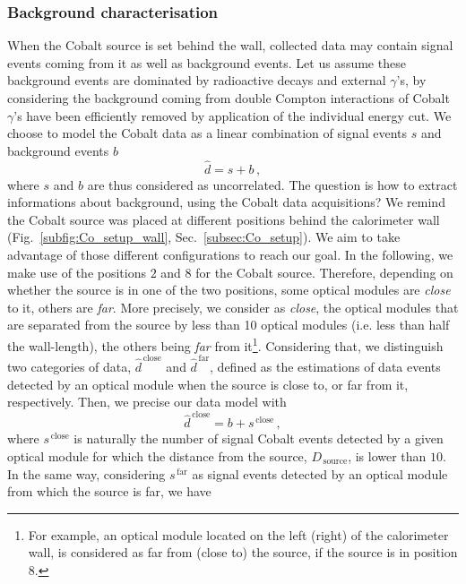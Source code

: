 \subsubsection*{Background characterisation}

When the Cobalt source is set behind the wall, collected data may contain signal events coming from it as well as background events.
Let us assume these background events are dominated by radioactive decays and external $\gamma$'s, by considering the background coming from double Compton interactions of Cobalt $\gamma$'s have been efficiently removed by application of the individual energy cut.
We choose to model the Cobalt data as a linear combination of signal events $s$ and background events $b$
\begin{equation}
  \hat{d}=s+b\,,
  \label{eq:estimation_data}
\end{equation}
where $s$ and $b$ are thus considered as uncorrelated.
The question is how to extract informations about background, using the Cobalt data acquisitions?
We remind the Cobalt source was placed at different positions behind the calorimeter wall (Fig.~\ref{subfig:Co_setup_wall}, Sec.~\ref{subsec:Co_setup}).
We aim to take advantage of those different configurations to reach our goal.
In the following, we make use of the positions $2$ and $8$ for the Cobalt source.
Therefore, depending on whether the source is in one of the two positions, some optical modules are \emph{close} to it, others are \emph{far}.
More precisely, we consider as \emph{close}, the optical modules that are separated from the source by less than 10 optical modules (i.e. less than half the wall-length), the others being \emph{far} from it\footnote{For example, an optical module located on the left (right) of the calorimeter wall, is considered as far from (close to) the source, if the source is in position $8$.}.
Considering that, we distinguish two categories of data, $\hat{d}^{\,\text{close}}$ and $\hat{d}^{\,\text{far}}$, defined as the estimations of data events detected by an optical module when the source is close to, or far from it, respectively.
Then, we precise our data model with
\begin{equation}
  \hat{d}^{\,\text{close}} = b + s^{\,\text{close}}\,,
  \label{eq:estimation_data_close}
\end{equation}
where $s^{\,\text{close}}$ is naturally the number of signal Cobalt events detected by a given optical module for which the distance from the source, $D_{\,\text{source}}$, is lower than $10$.
In the same way, considering $s^{\,\text{far}}$ as signal events detected by an optical module from which the source is far, we have
